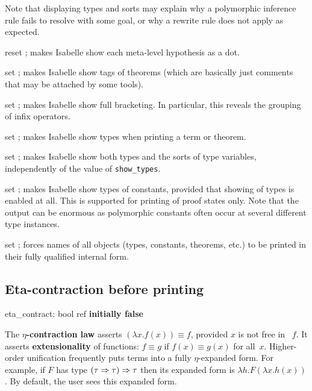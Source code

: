 Note that displaying types and sorts may explain why a polymorphic
inference rule fails to resolve with some goal, or why a rewrite rule
does not apply as expected.

\begin{ttdescription}

\item[reset \ttindexbold{show_hyps};] makes Isabelle show each
  meta-level hypothesis as a dot.
  
\item[set \ttindexbold{show_tags};] makes Isabelle show tags of theorems
  (which are basically just comments that may be attached by some tools).
  
\item[set \ttindexbold{show_brackets};] makes Isabelle show full
  bracketing.  In particular, this reveals the grouping of infix
  operators.
  
\item[set \ttindexbold{show_types};] makes Isabelle show types when
  printing a term or theorem.
  
\item[set \ttindexbold{show_sorts};] makes Isabelle show both types
  and the sorts of type variables, independently of the value of
  \texttt{show_types}.

\item[set \ttindexbold{show_consts};] makes Isabelle show types of
  constants, provided that showing of types is enabled at all.  This
  is supported for printing of proof states only.  Note that the
  output can be enormous as polymorphic constants often occur at
  several different type instances.

\item[set \ttindexbold{long_names};] forces names of all objects
  (types, constants, theorems, etc.) to be printed in their fully
  qualified internal form.

\end{ttdescription}


\subsection{Eta-contraction before printing}
\begin{ttbox} 
eta_contract: bool ref \hfill{\bf initially false}
\end{ttbox}
The {\bf $\eta$-contraction law} asserts $(\lambda x.f(x))\equiv f$,
provided $x$ is not free in ~$f$.  It asserts {\bf extensionality} of
functions: $f\equiv g$ if $f(x)\equiv g(x)$ for all~$x$.  Higher-order
unification frequently puts terms into a fully $\eta$-expanded form.  For
example, if $F$ has type $(\tau\Rightarrow\tau)\Rightarrow\tau$ then its expanded form is
$\lambda h.F(\lambda x.h(x))$.  By default, the user sees this expanded
form.

